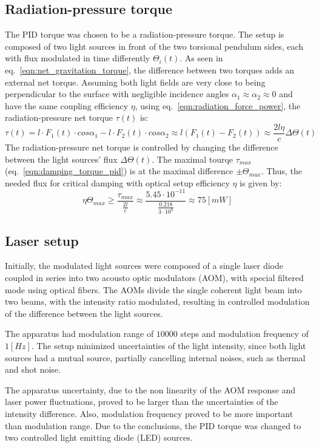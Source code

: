 \documentclass[\main/master.tex]{subfiles}
\begin{document}
\subsection{Radiation-pressure torque}
The PID torque was chosen to be a radiation-pressure torque. The setup is composed of two light sources in front of the two torsional pendulum sides, each with flux modulated in time differently $\Theta_i(t)$. As seen in eq.~\ref{eqn:net_gravitation_torque}, the difference between two torques adds an external net torque. Assuming both light fields are very close to being perpendicular to the surface with negligible incidence angles $\alpha_1\approx\alpha_2\approx 0$ and have the same coupling efficiency $\eta$, using eq.~\ref{eqn:radiation_force_power}, the radiation-pressure net torque $\tau(t)$ is:  
\begin{equation}
\tau(t) = l\cdot F_1(t) \cdot cos\alpha_1 - l\cdot F_2(t) \cdot cos\alpha_2\approx l(F_1(t) - F_2(t)) \approx \frac{2l\eta}{{c}} \Delta \Theta(t) \label{eqn:radiation torque}
\end{equation}
The radiation-pressure net torque is controlled by changing the difference between the light sources' flux $\Delta \Theta(t)$. The maximal tourqe $\tau_{max}$ (eq.~\ref{eqn:damping_torque_pid}) is at the maximal difference $\pm \Theta_{max}$. Thus, the needed flux for critical damping with optical setup efficiency $\eta$ is given by: 
\begin{equation}
\eta\Theta_{max} \geq \frac{\tau_{max}}{\frac{2 l}{c}}\approx \frac{5.45\cdot10^{-11}}{\frac{ 0.218}{3\cdot10^{8}}}\approx 75 [mW]
\label{eqn:max radiation torque}
\end{equation}

\subsection{Laser setup}
Initially, the modulated light sources were composed of a single laser diode coupled in series into two acousto optic modulators (AOM), with special filtered mode using optical fibers. The AOMs divide the single coherent light beam into two beams, with the intensity ratio modulated, resulting in controlled modulation of the difference between the light sources.
\par\noindent
The apparatus had modulation range of $10000$ steps and modulation frequency of $1 [Hz]$. The setup minimized uncertainties of the light intensity, since both light sources had a mutual source, partially cancelling internal noises, such as thermal and shot noise. 
\par\noindent
The apparatus uncertainty, due to the non linearity of the AOM response and laser power fluctuations, proved to be larger than the uncertainties of the intensity difference. Also, modulation frequency proved to be more important than modulation range. Due to the conclusions, the PID torque was changed to two controlled light emitting diode (LED) sources.
\end{document}
